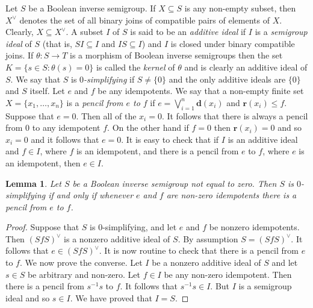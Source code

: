\documentclass[a4paper]{amsart}
\newtheorem{lemma}[theorem]{Lemma}
\newtheorem{proposition}[theorem]{Proposition}
\begin{document}


Let $S$ be a Boolean inverse semigroup.
If $X \subseteq S$ is any non-empty subset, then $X^{\vee}$ denotes the set 
of all binary joins of compatible pairs of elements of $X$.
Clearly, $X \subseteq X^{\vee}$.
A subset $I$ of $S$ is said to be an {\em additive ideal}
if $I$ is a {\em semigroup ideal} of $S$ (that is, $SI \subseteq I$ and $IS \subseteq I$)
and $I$ is closed under binary compatible joins.
If $\theta \colon S \rightarrow T$ is a morphism of Boolean inverse semigroups
then the set $K = \{s \in S \colon \theta (s) = 0\}$ is called the {\em kernel} of $\theta$
and is clearly an additive ideal of $S$.
We say that $S$ is {\em $0$-simplifying} if $S \neq \{0\}$
and the only additive ideals are $\{0\}$ and $S$ itself.
Let $e$ and $f$ be any idempotents.
We say that a non-empty finite set $X = \{x_{1},\ldots, x_{n}\}$ is a {\em pencil from $e$ to $f$}
if $e = \bigvee_{i=1}^{n} \mathbf{d}(x_{i})$ and $\mathbf{r}(x_{i}) \leq f$.
Suppose that $e = 0$.
Then all of the $x_{i} = 0$.
It follows that there is always a pencil from $0$ to any idempotent $f$.
On the other hand if $f = 0$ then $\mathbf{r}(x_{i}) = 0$ and so $x_{i} = 0$ and it follows that $e = 0$.
It is easy to check that if $I$ is an additive ideal and $f \in I$, where $f$ is an idempotent,
and there is a pencil from $e$ to $f$, where $e$ is an idempotent, then $e \in I$.

\begin{lemma}\label{lem:zero-simplifying} 
Let $S$ be a Boolean inverse semigroup not equal to zero.
Then $S$ is $0$-simplifying if and only if whenever $e$ and $f$ are non-zero idempotents
there is a pencil from $e$ to $f$.
\end{lemma}
\begin{proof} Suppose that $S$ is $0$-simplifying, and let $e$ and $f$ be nonzero idempotents.
Then $(SfS)^{\vee}$ is a nonzero additive ideal of $S$.
By assumption $S = (SfS)^{\vee}$.
It follows that $e \in (SfS)^{\vee}$.
It is now routine to check that there is a pencil from $e$ to $f$.
We now prove the converse.
Let $I$ be a nonzero additive ideal of $S$ and let $s \in S$ be arbitrary and non-zero.
Let $f \in I$ be any non-zero idempotent.
Then there is a pencil from $s^{-1}s$ to $f$.
It follows that $s^{-1}s \in I$.
But $I$ is a semigroup ideal and so $s \in I$.
We have proved that $I = S$.
\end{proof}
\end{document}
